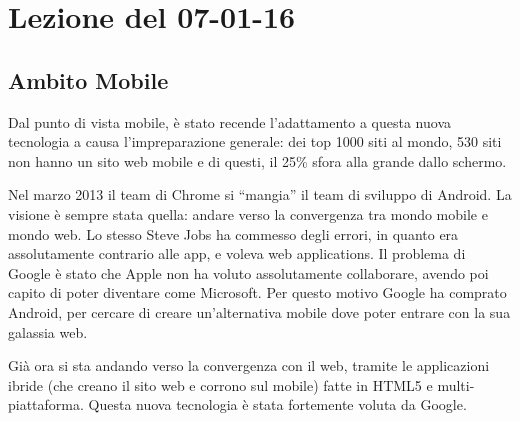 \section{Lezione del 07-01-16}

\subsection{Ambito Mobile}

Dal punto di vista mobile, \`e stato recende l'adattamento a questa nuova tecnologia a causa l'impreparazione generale: dei top 1000 siti al mondo, 530 siti non hanno un sito web mobile e di questi, il 25\% sfora alla grande dallo schermo.

Nel marzo 2013 il team di Chrome si ``mangia'' il team di sviluppo di Android. La visione \`e sempre stata quella: andare verso la convergenza tra mondo mobile e mondo web. Lo stesso Steve Jobs ha commesso degli errori, in quanto era assolutamente contrario alle app, e voleva web applications. Il problema di Google \`e stato che Apple non ha voluto assolutamente collaborare, avendo poi capito di poter diventare come Microsoft. Per questo motivo Google ha comprato Android, per cercare di creare un'alternativa mobile dove poter entrare con la sua galassia web.

Gi\`a ora si sta andando verso la convergenza con il web, tramite le applicazioni ibride (che creano il sito web e corrono sul mobile) fatte in HTML5 e multi-piattaforma. Questa nuova tecnologia \`e stata fortemente voluta da Google.

